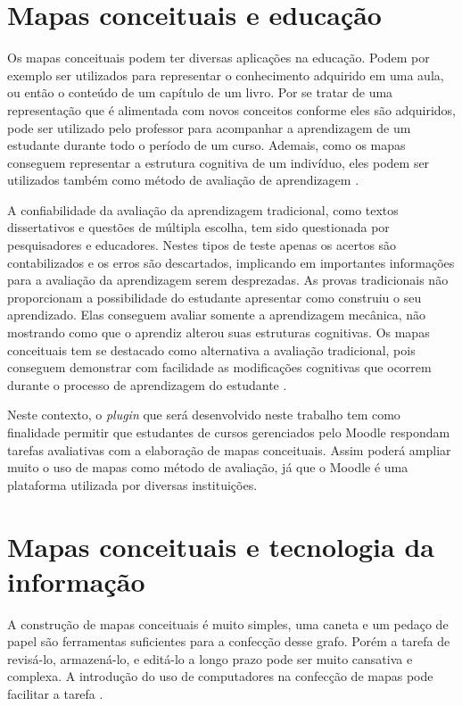 \documentclass[
	12pt,				%
	openright,			%
	oneside,			%
	a4paper,			%
	english,			%
	french,				%
	spanish,			%
	brazil				%
	]{abntex2}
\begin{document}
\section{Mapas conceituais e educação}\label{sec-mapeduc}

Os mapas conceituais podem ter diversas aplicações na educação. Podem por exemplo ser utilizados para representar o conhecimento adquirido em uma aula, ou então o conteúdo de um capítulo de um livro. Por se tratar de uma representação que é alimentada com novos conceitos conforme eles são adquiridos, pode ser utilizado pelo professor para acompanhar a aprendizagem de um estudante durante todo o período de um curso. Ademais, como os mapas conseguem representar a estrutura cognitiva de um indivíduo, eles podem ser utilizados também como método de avaliação de aprendizagem \cite{Perin2014}.

A confiabilidade da avaliação da aprendizagem tradicional, como textos dissertativos e questões de múltipla escolha, tem sido questionada por pesquisadores e educadores. Nestes tipos de teste apenas os acertos são contabilizados e os erros são descartados, implicando em importantes informações para a avaliação da aprendizagem serem desprezadas.
As provas tradicionais não proporcionam a possibilidade do estudante apresentar como construiu o seu aprendizado. Elas conseguem avaliar somente a aprendizagem mecânica, não mostrando como que o aprendiz alterou suas estruturas cognitivas.
Os mapas conceituais tem se destacado como alternativa a avaliação tradicional, pois conseguem demonstrar com facilidade as modificações cognitivas que ocorrem durante o processo de aprendizagem do estudante \cite{Dutra2002}.

Neste contexto, o \textit{plugin} que será desenvolvido neste trabalho tem como finalidade permitir que estudantes de cursos gerenciados pelo Moodle respondam tarefas avaliativas com a elaboração de mapas conceituais. Assim poderá ampliar muito o uso de mapas como método de avaliação, já que o Moodle é uma plataforma utilizada por diversas instituições.

\section{Mapas conceituais e tecnologia da informação}

A construção de mapas conceituais é muito simples, uma caneta e um pedaço de papel são ferramentas suficientes para a confecção desse grafo. Porém a tarefa de revisá-lo, armazená-lo, e editá-lo a longo prazo  pode ser muito cansativa e complexa. A introdução do uso de computadores na confecção de mapas pode facilitar a tarefa \cite{Novak2006}.
\end{document}
